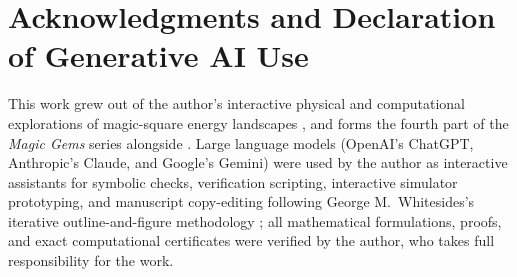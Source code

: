 \section*{Acknowledgments and Declaration of Generative AI Use}
\label{sec:ai_statement}

This work grew out of the author's interactive physical and computational explorations of magic-square energy landscapes \cite{mathewson2026physicalsolver}, and forms the fourth part of the \emph{Magic Gems} series alongside \cite{mathewson2026gems,mathewson2026moments,mathewson2026mechanics}. Large language models (OpenAI's ChatGPT, Anthropic's Claude, and Google's Gemini) were used by the author as interactive assistants for symbolic checks, verification scripting, interactive simulator prototyping, and manuscript copy-editing following George M.~Whitesides's iterative outline-and-figure methodology \cite{whitesides2004writing}; all mathematical formulations, proofs, and exact computational certificates were verified by the author, who takes full responsibility for the work.
